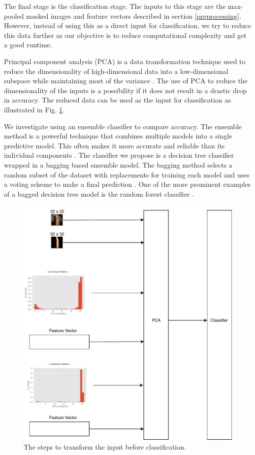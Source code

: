 The final stage is the classification stage. The inputs to this stage are the max-pooled masked images and feature vectors described in section \ref{preprocessing}. However, instead of using this as a direct input for classification, we try to reduce this data further as our objective is to reduce computational complexity and get a good runtime.

Principal component analysis (PCA) is a data transformation technique used to reduce the dimensionality of high-dimensional data into a low-dimensional subspace while maintaining most of the variance \cite{b5_1,b5_2}. The use of PCA to reduce the dimensionality of the inputs is a possibility if it does not result in a drastic drop in accuracy. The reduced data can be used as the input for classification as illustrated in Fig. \ref{fig:pca}.

We investigate using an ensemble classifier to compare accuracy. The ensemble method is a powerful technique that combines multiple models into a single predictive model. This often makes it more accurate and reliable than its individual components \cite{b5_3}. The classifier we propose is a decision tree classifier wrapped in a bagging based ensemble model. The bagging method selects a random subset of the dataset with replacements for training each model and uses a voting scheme to make a final prediction \cite{b5_4}. One of the more prominent examples of a bagged decision tree model is the random forest classifier \cite{b5_5}.

\begin{figure}[tp]
	\centerline{\includegraphics[scale=0.5]{./img/pca.pdf}}
	\caption{The steps to transform the input before classification.}
	\label{fig:pca}
\end{figure}